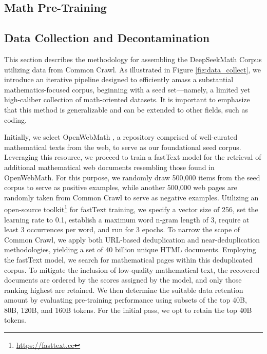 \begin{itemize}[topsep=0pt]
\section{Math Pre-Training}

\subsection{Data Collection and Decontamination}  
This section describes the methodology for assembling the DeepSeekMath Corpus utilizing data from Common Crawl. As illustrated in Figure \ref{fig:data_collect}, we introduce an iterative pipeline designed to efficiently amass a substantial mathematics-focused corpus, beginning with a seed set—namely, a limited yet high-caliber collection of math-oriented datasets. It is important to emphasize that this method is generalizable and can be extended to other fields, such as coding.

Initially, we select OpenWebMath \citep{openwebmath}, a repository comprised of well-curated mathematical texts from the web, to serve as our foundational seed corpus. Leveraging this resource, we proceed to train a fastText model \citep{joulin2016fasttext} for the retrieval of additional mathematical web documents resembling those found in OpenWebMath. For this purpose, we randomly draw 500,000 items from the seed corpus to serve as positive examples, while another 500,000 web pages are randomly taken from Common Crawl to serve as negative examples. Utilizing an open-source toolkit\footnote{\url{https://fasttext.cc}} for fastText training, we specify a vector size of 256, set the learning rate to 0.1, establish a maximum word n-gram length of 3, require at least 3 occurrences per word, and run for 3 epochs. To narrow the scope of Common Crawl, we apply both URL-based deduplication and near-deduplication methodologies, yielding a set of 40 billion unique HTML documents. Employing the fastText model, we search for mathematical pages within this deduplicated corpus. To mitigate the inclusion of low-quality mathematical text, the recovered documents are ordered by the scores assigned by the model, and only those ranking highest are retained. We then determine the suitable data retention amount by evaluating pre-training performance using subsets of the top 40B, 80B, 120B, and 160B tokens. For the initial pass, we opt to retain the top 40B tokens.


\end{itemize}
